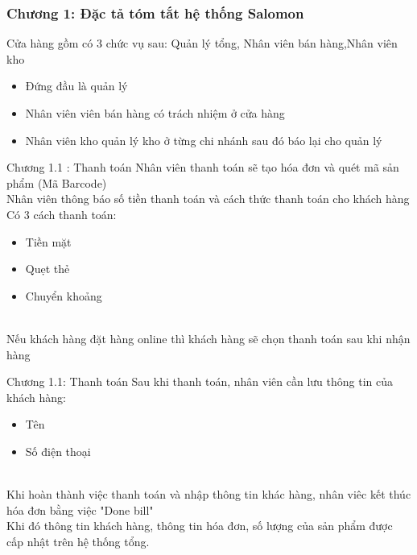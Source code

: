 \documentclass{beamer}
\begin{document}

\begin{frame}
    \frametitle{Chương 1: Đặc tả tóm tắt hệ thống Salomon}
     Cửa hàng gồm có 3 chức vụ sau: Quản lý tổng, Nhân viên bán hàng,Nhân viên kho
    \begin{itemize}
        \item Đứng đầu là quản lý
        \item Nhân viên viên bán hàng có trách nhiệm ở cửa hàng
        \item Nhân viên kho quản lý kho ở từng chi nhánh sau đó báo lại cho quản lý
    \end{itemize}
\end{frame}
\begin{frame}{Chương 1.1 : Thanh toán}
    Nhân viên thanh toán sẽ tạo hóa đơn và quét mã sản phẩm (Mã Barcode) \\
    
    Nhân viên thông báo số tiền thanh toán và cách thức thanh toán cho khách hàng \\
    
    Có 3 cách thanh toán:
    \begin{itemize}
        \item Tiền mặt
        \item Quẹt thẻ
        \item Chuyển khoảng
    \end{itemize}\\
    Nếu khách hàng đặt hàng online thì khách hàng sẽ chọn thanh toán sau khi nhận hàng
\end{frame}
\begin{frame}{Chương 1.1: Thanh toán}
    Sau khi thanh toán, nhân viên cần lưu thông tin của khách hàng:\\
    \begin{itemize}
        \item Tên
        \item Số điện thoại
    \end{itemize}\\
    Khi hoàn thành việc thanh toán và nhập thông tin khác hàng, nhân viêc kết thúc hóa đơn bằng việc "Done bill"\\
    Khi đó thông tin khách hàng, thông tin hóa đơn, số lượng của sản phẩm được cấp nhật trên hệ thống tổng.
\end{frame}
\end{document}
